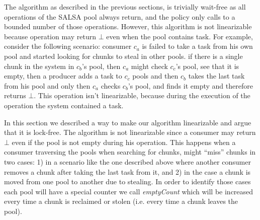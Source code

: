 The algorithm as described in the previous sections, is trivially wait-free as all operations of the SALSA pool always return, and the policy only calls to a bounded number of those operations. However, this algorithm is not linearizable because operation may return $\bot$ even when the pool contains task. For example, consider the following scenario: consumer $c_a$ is failed to take a task from his own pool and started looking for chunks to steal in other pools. if there is a single chunk in the system in $c_b$'s pool, then $c_a$ might check $c_c$'s pool, see that it is empty, then a producer adds a task to $c_c$ pools and then $c_b$ takes the last task from his pool and only then $c_a$ checks $c_b$'s pool, and finds it empty and therefore returns $\bot$. This operation isn't linearizable, because during the execution of the operation the system contained a task.  

In this section we described a way to make our algorithm linearizable and argue that it is lock-free. The algorithm is not linearizable since a consumer may return $\bot$ even if the pool is not empty during his operation. This happens when a consumer traversing the pools when searching for chunks, might ``miss'' chunks in two cases: 1) in a scenario like the one described above where another consumer removes a chunk after taking the last task from it, and 2) in the case a chunk is moved from one pool to another due to stealing. In order to identify those cases each pool will have a special counter we call \emph{emptyCount} which will be increased every time a chunk is reclaimed or stolen (i.e. every time a chunk leaves the pool).

